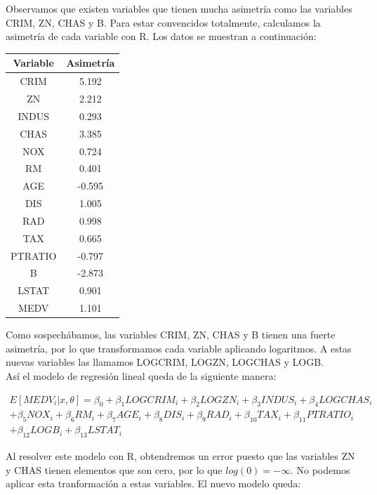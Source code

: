 \documentclass[12pt,a4paper,twoside,openright,titlepage,final]{article}
\begin{document}
Observamos que existen variables que tienen mucha asimetría como las variables CRIM, ZN, CHAS y B. Para estar convencidos totalmente, calculamos la asimetría de cada variable con R. Los datos se muestran a continuación:

\begin{table}[htbp!]
\centering
\begin{tabular}{@{}cc@{}}
\toprule
Variable & Asimetría \\ \midrule
CRIM     & 5.192     \\ \midrule
ZN       & 2.212     \\ \midrule
INDUS    & 0.293     \\ \midrule
CHAS     & 3.385     \\ \midrule
NOX      & 0.724     \\ \midrule
RM       & 0.401     \\ \midrule
AGE      & -0.595    \\ \midrule
DIS      & 1.005     \\ \midrule
RAD      & 0.998     \\ \midrule
TAX      & 0.665     \\ \midrule
PTRATIO  & -0.797    \\ \midrule
B        & -2.873    \\ \midrule
LSTAT    & 0.901     \\ \midrule
MEDV     & 1.101     \\ \bottomrule
\end{tabular}
\end{table}

Como sospechábamos, las variables CRIM, ZN, CHAS y B tienen una fuerte asimetría, por lo que transformamos cada variable aplicando logaritmos. A estas nuevas variables las llamamos LOGCRIM, LOGZN, LOGCHAS y LOGB.\\

Así el modelo de regresión lineal queda de la siguiente manera:

\begin{multline*}
E[MEDV_i |x, \theta] = \beta_0 + \beta_1 LOGCRIM_i + \beta_2 LOGZN_i + \beta_3 INDUS_i + \beta_4 LOGCHAS_i \\ + \beta_5 NOX_i + \beta_6 RM_i + \beta_7 AGE_i + \beta_8 DIS_i + \beta_9 RAD_i + \beta_{10} TAX_i + \beta_{11} PTRATIO_i \\ + \beta_{12} LOGB_i + \beta_{13} LSTAT_i
\end{multline*}

Al resolver este modelo con R, obtendremos un error puesto que las variables ZN y CHAS tienen elementos que son cero, por lo que $log(0) = -\infty$. No podemos aplicar esta tranformación a estas variables. El nuevo modelo queda:
\end{document}
